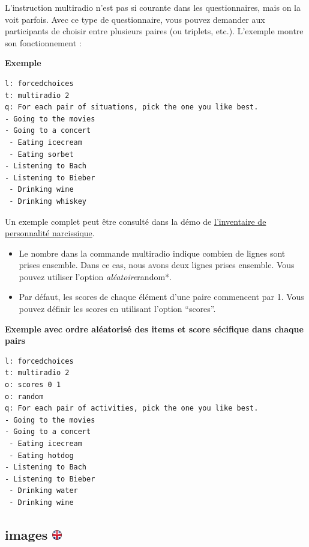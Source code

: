 \documentclass[
]{book}
\providecommand{\tightlist}{%
  \setlength{\itemsep}{0pt}\setlength{\parskip}{0pt}}
\begin{document}
L'instruction multiradio n'est pas si courante dans les questionnaires, mais on la voit parfois. Avec ce type de questionnaire, vous pouvez demander aux participants de choisir entre plusieurs paires (ou triplets, etc.). L'exemple montre son fonctionnement :

\textbf{Exemple}

\begin{verbatim}
l: forcedchoices
t: multiradio 2
q: For each pair of situations, pick the one you like best.
- Going to the movies
- Going to a concert
 - Eating icecream
 - Eating sorbet
- Listening to Bach
- Listening to Bieber
 - Drinking wine
 - Drinking whiskey
\end{verbatim}

Un exemple complet peut être consulté dans la démo de \href{https://www.psytoolkit.org/survey-library/narcism-npi16.html}{l'inventaire de personnalité narcissique}.

\begin{itemize}
\tightlist
\item
  Le nombre dans la commande multiradio indique combien de lignes sont prises ensemble. Dans ce cas, nous avons deux lignes prises ensemble.
  Vous pouvez utiliser l'option \emph{aléatoire}random*.
\item
  Par défaut, les scores de chaque élément d'une paire commencent par 1. Vous pouvez définir les scores en utilisant l'option ``scores''.
\end{itemize}

\textbf{Exemple avec ordre aléatorisé des items et score sécifique dans chaque pairs}

\begin{verbatim}
l: forcedchoices
t: multiradio 2
o: scores 0 1
o: random
q: For each pair of activities, pick the one you like best.
- Going to the movies
- Going to a concert
 - Eating icecream
 - Eating hotdog
- Listening to Bach
- Listening to Bieber
 - Drinking water
 - Drinking wine
\end{verbatim}

\hypertarget{images}{%
\subsection[images ]{\texorpdfstring{images \href{https://www.psytoolkit.org/doc3.4.0/online-survey-syntax.html\#images}{\protect\includegraphics{img/ukflag.png}}}{images }}\label{images}}
\end{document}
